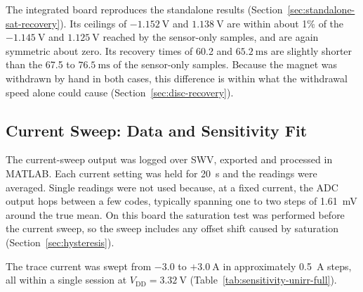 \documentclass[12pt,a4paper]{article}
\begin{document}
The integrated board reproduces the standalone results (Section~\ref{sec:standalone-sat-recovery}). Its ceilings of $\SI{-1.152}{\volt}$ and $\SI{+1.138}{\volt}$ are within about 1\% of the $\SI{-1.145}{\volt}$ and $\SI{+1.125}{\volt}$ reached by the sensor-only samples, and are again symmetric about zero. Its recovery times of 60.2 and $\SI{65.2}{\milli\second}$ are slightly shorter than the 67.5 to $\SI{76.5}{\milli\second}$ of the sensor-only samples. Because the magnet was withdrawn by hand in both cases, this difference is within what the withdrawal speed alone could cause (Section~\ref{sec:disc-recovery}).

\subsection{Current Sweep: Data and Sensitivity Fit}
\label{sec:sensitivity-fit}

The current-sweep output was logged over SWV, exported and processed in MATLAB. Each current setting was held for \SI{20}{\second} and the readings were averaged. Single readings were not used because, at a fixed current, the ADC output hops between a few codes, typically spanning one to two steps of \SI{1.61}{\milli\volt} around the true mean. On this board the saturation test was performed before the current sweep, so the sweep includes any offset shift caused by saturation (Section~\ref{sec:hysteresis}).



The trace current was swept from $-3.0$ to $+\SI{3.0}{\ampere}$ in approximately \SI{0.5}{\ampere} steps, all within a single session at $V_{\text{DD}} = \SI{3.32}{\volt}$ (Table~\ref{tab:sensitivity-unirr-full}).
\end{document}
